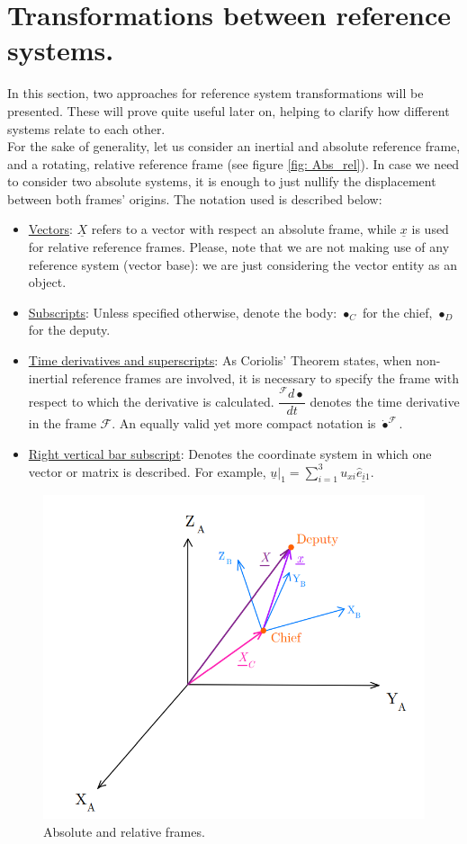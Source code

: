 \section{Transformations between reference systems.}
%
\indent In this section, two approaches for reference system transformations will be presented. These will prove quite useful later on, helping to clarify how different systems relate to each other. \\
%
\indent For the sake of generality, let us consider an inertial and absolute reference frame, and a rotating, relative reference frame (see figure \ref{fig:	Abs_rel}). In case we need to consider two absolute systems, it is enough to just nullify the displacement between both frames' origins. The notation used is described below:
%
\begin{itemize}
%
\item \underline{Vectors}: $\underline{X}$ refers to a vector with respect an absolute frame, while $\underline{x}$ is used for relative reference frames. Please, note that we are not making use of any reference system (\ie vector base): we are just considering the vector entity as an object.
%
\item \underline{Subscripts}: Unless specified otherwise, denote the body: $\bullet_{C}$ for the chief, $\bullet_D$ for the deputy.
%
\item \underline{Time derivatives and superscripts}: As Coriolis' Theorem states, when non-inertial reference frames are involved, it is necessary to specify the frame with respect to which the derivative is calculated. $\dfrac{^{\mathcal{F}} d \bullet}{dt}$ denotes the time derivative in the frame $\mathcal{F}$. An equally valid yet more compact notation is $\dot{\bullet}^{\mathcal{F}}$. 
%
\item \underline{Right vertical bar subscript}: Denotes the coordinate system in which one vector or matrix is described. For example, $\underline{u}\rvert_{1} = \sum_{i=1}^3 u_{xi} \underline{\hat{e}_{i1}} $.
%
\end{itemize}
%
%
\begin{figure}[!htb]
\centering\includegraphics[width = 0.6\linewidth]{Appendices/Appendix_B/Abs_rel}
\caption{Absolute and relative frames.}
\label{fig:	Abs_rel}
\end{figure}
